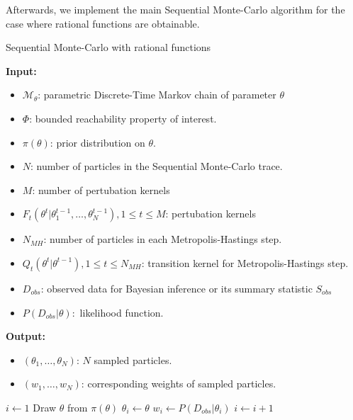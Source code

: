 Afterwards, we implement the main Sequential Monte-Carlo algorithm for the case where rational
functions are obtainable.
\begin{algorithm}[H]
      \caption{Sequential Monte-Carlo with rational functions}
      \label{rf-smc-alg}
      \hspace*{\algorithmicindent} \textbf{Input:}
      \begin{itemize}
            \item $\mathcal{M}_\theta$: parametric Discrete-Time Markov chain of parameter $\theta$
            \item $\Phi$: bounded reachability property of interest.
            \item $\pi(\theta)$: prior distribution on $\theta$.
            \item $N$: number of particles in the Sequential Monte-Carlo trace.
            \item $M$: number of pertubation kernels
            \item $F_t(\theta^t | \theta^{t-1}_1,\ldots,\theta^{t-1}_N), 1\leq t \leq M$: pertubation kernels
            \item $N_{MH}$: number of particles in each Metropolis-Hastings step.
            \item $Q_t(\theta^t|\theta^{t-1}), 1 \leq t \leq N_{MH}$: transition kernel for Metropolis-Hastings step.
            \item $D_{obs}$: observed data for Bayesian inference or its summary statistic $S_{obs}$
            \item $P(D_{obs}|\theta):$ likelihood function.
      \end{itemize}
      \hspace*{\algorithmicindent} \textbf{Output:}
      \begin{itemize}
            \item $(\theta_1,\ldots,\theta_N)$: $N$ sampled particles.
            \item $(w_1,\ldots,w_N)$: corresponding weights of sampled particles.
      \end{itemize}
      \begin{algorithmic}[1]
            \State $i \leftarrow 1$
             
            \State Draw $\theta$ from $\pi(\theta)$
            \State $\theta_i \leftarrow \theta$
            \State $w_i \leftarrow P(D_{obs}|\theta_i)$
            \State $i \leftarrow i + 1$
            \EndWhile
      \end{algorithmic}
\end{algorithm}

